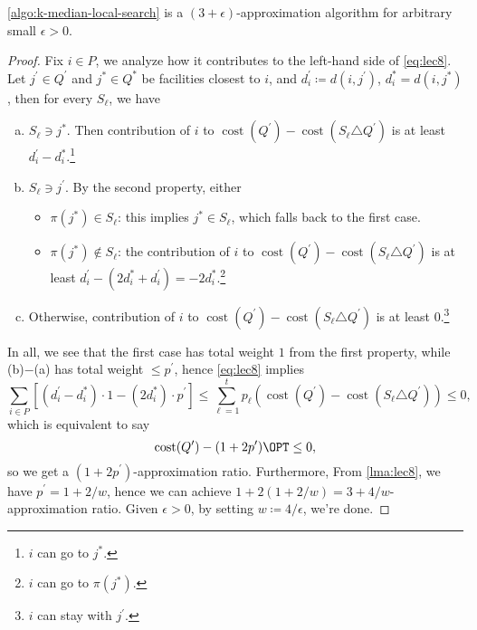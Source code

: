 \begin{theorem}\label{thm:lec8}
	\autoref{algo:k-median-local-search} is a \((3 + \epsilon)\)-approximation algorithm for arbitrary small \(\epsilon > 0\).
\end{theorem}
\begin{proof}
	Fix \(i\in P\), we analyze how it contributes to the left-hand side of \autoref{eq:lec8}. Let \(j^\prime \in Q^\prime \) and \(j^{\ast} \in Q^{\ast} \) be facilities closest to \(i\), and \(d_i^\prime \coloneqq d(i, j^\prime )\), \(d_i^{\ast} = d(i, j^{\ast} )\), then for every \(S_{\ell}\), we have
	\begin{enumerate}[(a)]
		\item \(S_{\ell }\ni j^{\ast} \). Then contribution of \(i\) to \(\mathop{\mathrm{cost}}(Q^\prime ) - \mathop{\mathrm{cost}}(S_{\ell }\triangle Q^\prime)\) is at least \(d_i^\prime - d_i^{\ast}\).\footnote{\(i\) can go to \(j^{\ast} \).}
		\item \(S_{\ell }\ni j^\prime\). By the second property, either
		      \begin{itemize}
			      \item \(\pi (j^{\ast} )\in S_{\ell } \): this implies \(j^{\ast}\in S_{\ell }\), which falls back to the first case.
			      \item \(\pi (j^{\ast} )\notin S_{\ell } \): the contribution of \(i\) to \(\mathop{\mathrm{cost}}(Q^\prime ) - \mathop{\mathrm{cost}}(S_{\ell }\triangle Q^\prime)\) is at least \(d_i^\prime - (2d_i^{\ast} + d_i^\prime ) = -2d_i^{\ast}\).\footnote{\(i\) can go to \(\pi (j^{\ast} )\).}
		      \end{itemize}
		\item Otherwise, contribution of \(i\) to \(\mathop{\mathrm{cost}}(Q^\prime ) - \mathop{\mathrm{cost}}(S_{\ell }\triangle Q^\prime)\) is at least \(0\).\footnote{\(i\) can stay with \(j^\prime \).}
	\end{enumerate}

	In all, we see that the first case has total weight \(1\) from the first property, while (b)\(-\)(a) has total weight \(\leq p^\prime \), hence \autoref{eq:lec8} implies
	\[
		\sum_{i\in P} \left[ (d_i^\prime - d_i^{\ast} )\cdot 1 - (2d_i^{\ast} )\cdot p^\prime \right] \leq \sum_{\ell =1} ^t p_{\ell } (\mathop{\mathrm{cost}}(Q^\prime ) - \mathop{\mathrm{cost}}(S_{\ell }\triangle Q^\prime)) \leq 0,
	\]
	which is equivalent to say
	\[
		\mathop{\mathrm{cost}}(Q^\prime ) - (1 + 2p^\prime )\OPT \leq 0,
	\]
	so we get a \((1 + 2p^\prime )\)-approximation ratio. Furthermore, From \autoref{lma:lec8}, we have \(p^\prime = 1 + 2 / w\), hence we can achieve \(1 + 2(1 + 2 / w) = 3 + 4 / w\)-approximation ratio. Given \(\epsilon > 0\), by setting \(w \coloneqq 4/\epsilon \), we're done.
\end{proof}